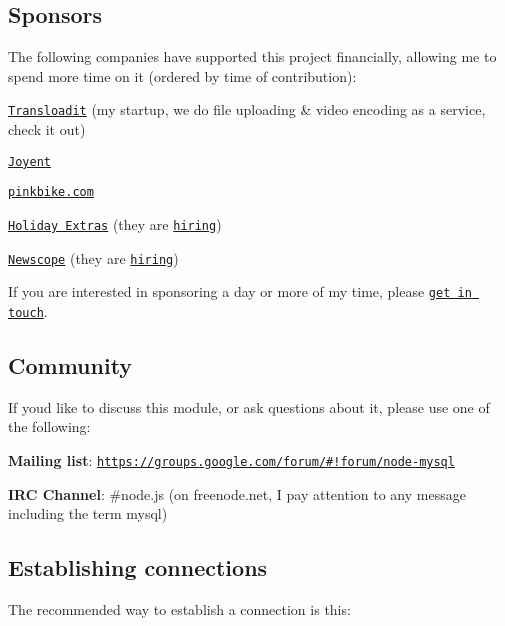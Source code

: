 \subsection*{Sponsors}

The following companies have supported this project financially, allowing me to spend more time on it (ordered by time of contribution)\+:


\begin{DoxyItemize}
\item \href{http://transloadit.com}{\tt Transloadit} (my startup, we do file uploading \& video encoding as a service, check it out)
\item \href{http://www.joyent.com/}{\tt Joyent}
\item \href{http://pinkbike.com/}{\tt pinkbike.\+com}
\item \href{http://www.holidayextras.co.uk/}{\tt Holiday Extras} (they are \href{http://join.holidayextras.co.uk/vacancy/software-engineer/}{\tt hiring})
\item \href{http://newscope.com/}{\tt Newscope} (they are \href{http://www.newscope.com/stellenangebote}{\tt hiring})
\end{DoxyItemize}

If you are interested in sponsoring a day or more of my time, please \href{http://felixge.de/#consulting}{\tt get in touch}.

\subsection*{Community}

If you\textquotesingle{}d like to discuss this module, or ask questions about it, please use one of the following\+:


\begin{DoxyItemize}
\item {\bfseries Mailing list}\+: \href{https://groups.google.com/forum/#!forum/node-mysql}{\tt https\+://groups.\+google.\+com/forum/\#!forum/node-\/mysql}
\item {\bfseries I\+R\+C Channel}\+: \#node.\+js (on freenode.\+net, I pay attention to any message including the term {\ttfamily mysql})
\end{DoxyItemize}

\subsection*{Establishing connections}

The recommended way to establish a connection is this\+:


